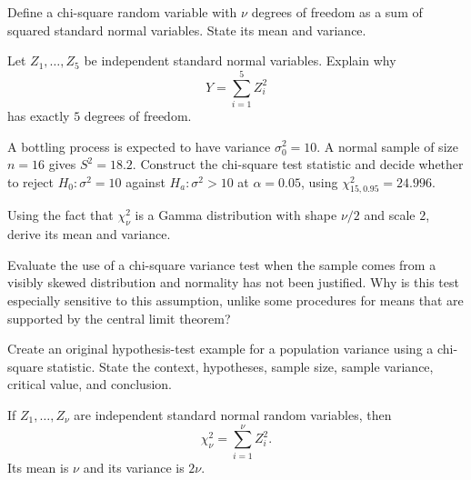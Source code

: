 \begin{problema}\label{prob:0d114e5}
Define a chi-square random variable with $\nu$ degrees of freedom as a sum of squared standard normal variables. State its mean and variance.
\end{problema}

\begin{problema}\label{prob:66b286b}
Let $Z_1,\ldots,Z_5$ be independent standard normal variables. Explain why
\[
	Y=\sum_{i=1}^5 Z_i^2
\]
has exactly $5$ degrees of freedom.
\end{problema}

\begin{problema}\label{prob:94c69e2}
A bottling process is expected to have variance $\sigma_0^2=10$. A normal sample of size $n=16$ gives $S^2=18.2$. Construct the chi-square test statistic and decide whether to reject $H_0:\sigma^2=10$ against $H_a:\sigma^2>10$ at $\alpha=0.05$, using $\chi^2_{15,0.95}=24.996$.
\end{problema}

\begin{problema}\label{prob:b08d077}
Using the fact that $\chi^2_\nu$ is a Gamma distribution with shape $\nu/2$ and scale $2$, derive its mean and variance.
\end{problema}

\begin{problema}\label{prob:db05590}
Evaluate the use of a chi-square variance test when the sample comes from a visibly skewed distribution and normality has not been justified. Why is this test especially sensitive to this assumption, unlike some procedures for means that are supported by the central limit theorem?
\end{problema}

\begin{problema}\label{prob:501e850}
Create an original hypothesis-test example for a population variance using a chi-square statistic. State the context, hypotheses, sample size, sample variance, critical value, and conclusion.
\end{problema}

\begin{solproblema}[prob:0d114e5]
If $Z_1,\ldots,Z_\nu$ are independent standard normal random variables, then
\[
	\chi^2_\nu=\sum_{i=1}^{\nu}Z_i^2.
\]
Its mean is $\nu$ and its variance is $2\nu$.
\end{solproblema}

